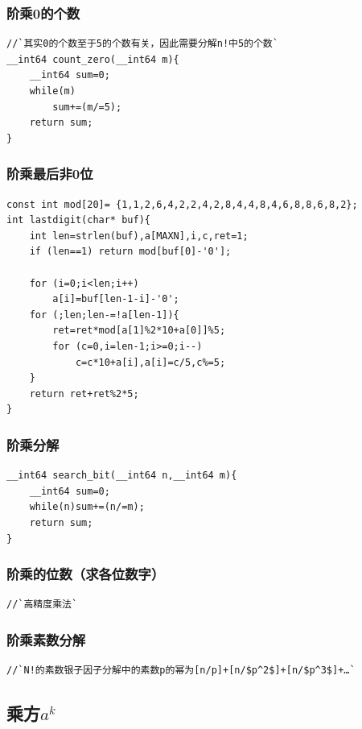 \documentclass[a4paper]{article}
\begin{document}
\begin{CJK*}{UTF8}{gbsn}
\begin{multicols}{3}
\begin{flushleft}
\subsubsection{阶乘0的个数}
\begin{lstlisting}
//`其实0的个数至于5的个数有关，因此需要分解n!中5的个数`
__int64 count_zero(__int64 m){
	__int64 sum=0;
	while(m)
		sum+=(m/=5);
	return sum;
}
\end{lstlisting}


\subsubsection{阶乘最后非0位}
\begin{lstlisting}
const int mod[20]= {1,1,2,6,4,2,2,4,2,8,4,4,8,4,6,8,8,6,8,2}; 
int lastdigit(char* buf){ 
    int len=strlen(buf),a[MAXN],i,c,ret=1; 
    if (len==1) return mod[buf[0]-'0']; 
    
    for (i=0;i<len;i++) 
        a[i]=buf[len-1-i]-'0'; 
    for (;len;len-=!a[len-1]){ 
        ret=ret*mod[a[1]%2*10+a[0]]%5; 
        for (c=0,i=len-1;i>=0;i--) 
            c=c*10+a[i],a[i]=c/5,c%=5; 
    } 
    return ret+ret%2*5; 
}
\end{lstlisting}


\subsubsection{阶乘分解}
\begin{lstlisting}
__int64 search_bit(__int64 n,__int64 m){
	__int64 sum=0;
	while(n)sum+=(n/=m);
	return sum;
}
\end{lstlisting}


\subsubsection{阶乘的位数（求各位数字）}
\begin{lstlisting}
//`高精度乘法`
\end{lstlisting}


\subsubsection{阶乘素数分解}
\begin{lstlisting}
//`N!的素数银子因子分解中的素数p的幂为[n/p]+[n/$p^2$]+[n/$p^3$]+…`
\end{lstlisting}

\subsection{乘方$a^k$}


\end{flushleft}
\end{multicols}
\end{CJK*}
\end{document}
